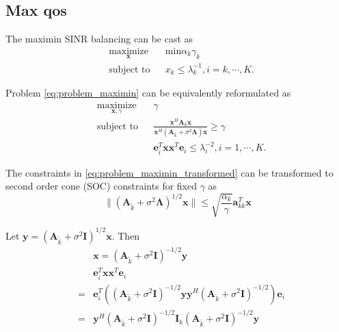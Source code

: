 \documentclass[12pt,journal,draftclsnofoot,onecolumn]{IEEEtran}
\begin{document}
\subsection{Max qos}
The maximin SINR balancing can be cast as
\begin{equation}
\begin{aligned} \label{eq:problem_maximin}
& \underset{\mathbf{x}}{\text{maximize}}
& & \text{min} \alpha_k\gamma_k \\
& \text{subject to}
&& x_k \leq \lambda_k^{-1}, i=k, \cdots, K.
\end{aligned}
\end{equation}

Problem \eqref{eq:problem_maximin} can be equivalently reformulated as
\begin{equation}
\begin{aligned} \label{eq:problem_maximin_transformed}
& \underset{\mathbf{x},\gamma}{\text{maximize}}
& & \gamma \\
& \text{subject to}
& &  \frac{\mathbf{x}^H\mathbf{A}_k\mathbf{x}}{\mathbf{x}^H \left(\mathbf{A}_{\tilde{k}} + \sigma^2\mathbf{\Lambda}\right)\mathbf{x}} \geq \gamma\\
&&&\mathbf{e}_i^T\mathbf{x}\mathbf{x}^T\mathbf{e}_i \leq \lambda_i^{-2}, i=1, \cdots, K.
\end{aligned}
\end{equation}

The constraints in \eqref{eq:problem_maximin_transformed} can be transformed to second order cone (SOC) constraints for fixed $\gamma$ as
\begin{equation}
\|\left(\mathbf{A}_{\tilde{k}} + \sigma^2\mathbf{\Lambda}\right)^{1/2}\mathbf{x}\| \leq \sqrt{\frac{\alpha_k}{\gamma}}\mathbf{a}_{kk}^T\mathbf{x}
\end{equation}

Let $\mathbf{y}=\left(\mathbf{A}_{\tilde{k}} + \sigma^2\mathbf{I}\right)^{1/2}\mathbf{x}$.
Then
\begin{eqnarray}
	&&\mathbf{x}=\left(\mathbf{A}_{\tilde{k}} + \sigma^2\mathbf{I}\right)^{-1/2}\mathbf{y}\\
	&&\mathbf{e}_i^T\mathbf{x}\mathbf{x}^T\mathbf{e}_i \\
	&=&\mathbf{e}_i^T\left(\left(\mathbf{A}_{\tilde{k}} + \sigma^2\mathbf{I}\right)^{-1/2}\mathbf{y}\mathbf{y}^H\left(\mathbf{A}_{\tilde{k}} + \sigma^2\mathbf{I}\right)^{-1/2}\right)\mathbf{e}_i\\
	&=& \mathbf{y}^H\left(\mathbf{A}_{\tilde{k}} + \sigma^2\mathbf{I}\right)^{-1/2}\mathbf{I}_k\left(\mathbf{A}_{\tilde{k}} + \sigma^2\mathbf{I}\right)^{-1/2}\mathbf{y}
\end{eqnarray}
\end{document}

